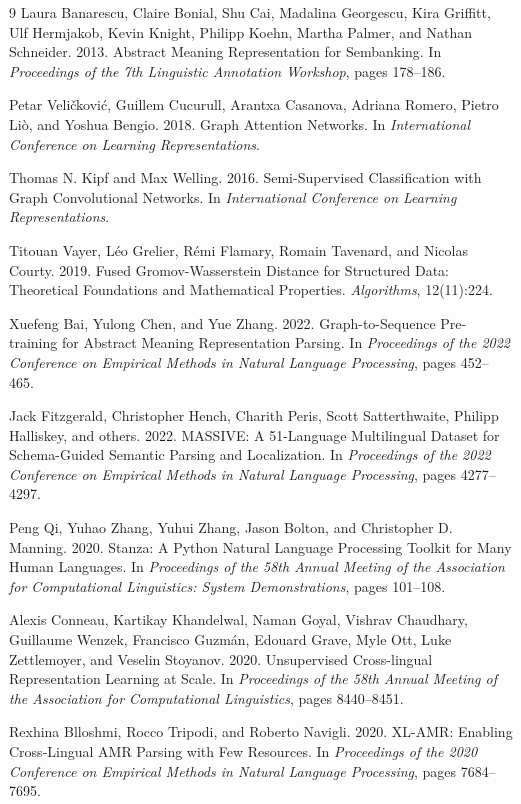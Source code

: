 \documentclass[11pt,a4paper,twocolumn]{article}
\begin{document}
\begin{thebibliography}{9}
Laura Banarescu, Claire Bonial, Shu Cai, Madalina Georgescu, Kira Griffitt, Ulf Hermjakob, Kevin Knight, Philipp Koehn, Martha Palmer, and Nathan Schneider. 2013.
\newblock Abstract Meaning Representation for Sembanking.
\newblock In \emph{Proceedings of the 7th Linguistic Annotation Workshop}, pages 178--186.

Petar Veli\v{c}kovi\'{c}, Guillem Cucurull, Arantxa Casanova, Adriana Romero, Pietro Li\`{o}, and Yoshua Bengio. 2018.
\newblock Graph Attention Networks.
\newblock In \emph{International Conference on Learning Representations}.

Thomas N. Kipf and Max Welling. 2016.
\newblock Semi-Supervised Classification with Graph Convolutional Networks.
\newblock In \emph{International Conference on Learning Representations}.

Titouan Vayer, L{\'e}o Grelier, R{\'e}mi Flamary, Romain Tavenard, and Nicolas Courty. 2019.
\newblock Fused Gromov-Wasserstein Distance for Structured Data: Theoretical Foundations and Mathematical Properties.
\newblock \emph{Algorithms}, 12(11):224.

Xuefeng Bai, Yulong Chen, and Yue Zhang. 2022.
\newblock Graph-to-Sequence Pre-training for Abstract Meaning Representation Parsing.
\newblock In \emph{Proceedings of the 2022 Conference on Empirical Methods in Natural Language Processing}, pages 452--465.

Jack Fitzgerald, Christopher Hench, Charith Peris, Scott Satterthwaite, Philipp Halliskey, and others. 2022.
\newblock MASSIVE: A 51-Language Multilingual Dataset for Schema-Guided Semantic Parsing and Localization.
\newblock In \emph{Proceedings of the 2022 Conference on Empirical Methods in Natural Language Processing}, pages 4277--4297.

Peng Qi, Yuhao Zhang, Yuhui Zhang, Jason Bolton, and Christopher D. Manning. 2020.
\newblock Stanza: A Python Natural Language Processing Toolkit for Many Human Languages.
\newblock In \emph{Proceedings of the 58th Annual Meeting of the Association for Computational Linguistics: System Demonstrations}, pages 101--108.

Alexis Conneau, Kartikay Khandelwal, Naman Goyal, Vishrav Chaudhary, Guillaume Wenzek, Francisco Guzm{\'a}n, Edouard Grave, Myle Ott, Luke Zettlemoyer, and Veselin Stoyanov. 2020.
\newblock Unsupervised Cross-lingual Representation Learning at Scale.
\newblock In \emph{Proceedings of the 58th Annual Meeting of the Association for Computational Linguistics}, pages 8440--8451.

Rexhina Blloshmi, Rocco Tripodi, and Roberto Navigli. 2020.
\newblock XL-AMR: Enabling Cross-Lingual AMR Parsing with Few Resources.
\newblock In \emph{Proceedings of the 2020 Conference on Empirical Methods in Natural Language Processing}, pages 7684--7695.
\end{thebibliography}
\end{document}
